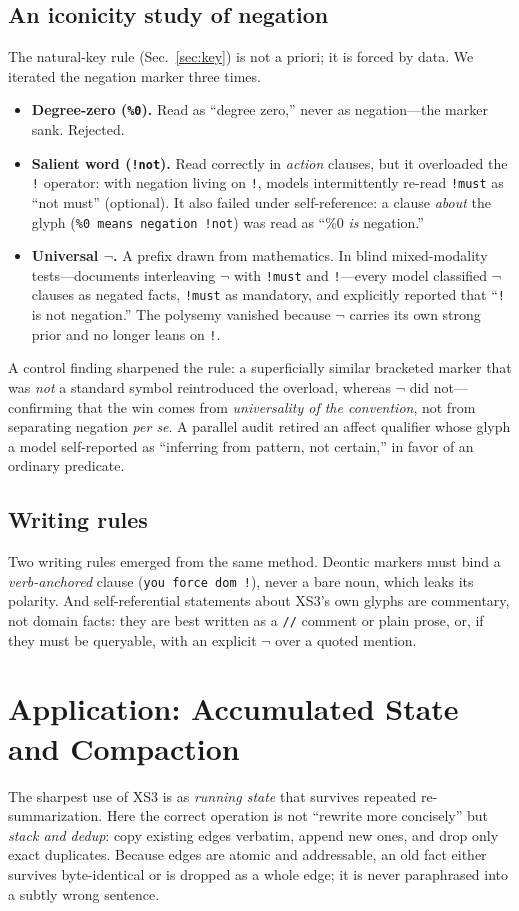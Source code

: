 \documentclass[conference]{IEEEtran}
\newcommand{\code}[1]{\texttt{#1}}
\begin{document}
\subsection{An iconicity study of negation}
The natural-key rule (Sec.~\ref{sec:key}) is not a priori; it is forced by data.
We iterated the negation marker three times.
\begin{itemize}
\item \textbf{Degree-zero (\code{\%0}).} Read as ``degree zero,'' never as
negation---the marker sank. Rejected.
\item \textbf{Salient word (\code{!not}).} Read correctly in \emph{action}
clauses, but it overloaded the \code{!} operator: with negation living on
\code{!}, models intermittently re-read \code{!must} as ``not must'' (optional).
It also failed under self-reference: a clause \emph{about} the glyph
(\code{\%0 means negation !not}) was read as ``\%0 \emph{is} negation.''
\item \textbf{Universal $\neg$.} A prefix drawn from mathematics. In blind
mixed-modality tests---documents interleaving $\neg$ with \code{!must} and
\code{!}---every model classified $\neg$ clauses as negated facts,
\code{!must} as mandatory, and explicitly reported that ``\code{!} is not
negation.'' The polysemy vanished because $\neg$ carries its own strong prior and
no longer leans on \code{!}.
\end{itemize}
A control finding sharpened the rule: a superficially similar bracketed marker
that was \emph{not} a standard symbol reintroduced the overload, whereas $\neg$
did not---confirming that the win comes from \emph{universality of the
convention}, not from separating negation \emph{per se}. A parallel audit retired
an affect qualifier whose glyph a model self-reported as ``inferring from
pattern, not certain,'' in favor of an ordinary predicate.

\subsection{Writing rules}
Two writing rules emerged from the same method. Deontic markers must bind a
\emph{verb-anchored} clause (\code{you force dom !}), never a bare noun,
which leaks its polarity. And self-referential statements about XS3's own glyphs
are commentary, not domain facts: they are best written as a \code{//} comment or
plain prose, or, if they must be queryable, with an explicit $\neg$ over a quoted
mention.

\section{Application: Accumulated State and Compaction}\label{sec:compact}
The sharpest use of XS3 is as \emph{running state} that survives repeated
re-summarization. Here the correct operation is not ``rewrite more concisely''
but \emph{stack and dedup}: copy existing edges verbatim, append new ones, and
drop only exact duplicates. Because edges are atomic and addressable, an old fact
either survives byte-identical or is dropped as a whole edge; it is never
paraphrased into a subtly wrong sentence.
\end{document}
